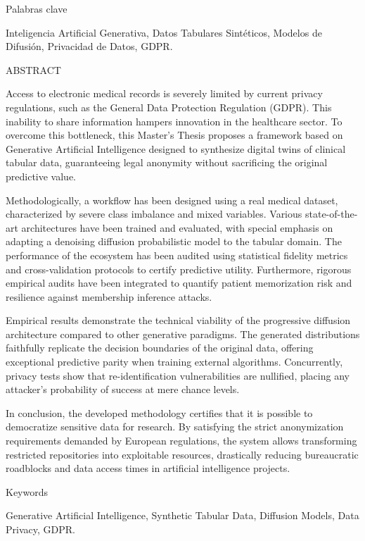 {\fontsize{13pt}{16pt}\selectfont\color{uaxblue} Palabras clave}\par

Inteligencia Artificial Generativa, Datos Tabulares Sintéticos, Modelos de Difusión, Privacidad de Datos, GDPR.

{\fontsize{16pt}{19pt}\selectfont\color{uaxblue} ABSTRACT}\par

Access to electronic medical records is severely limited by current privacy regulations, such as the General Data Protection Regulation (GDPR). This inability to share information hampers innovation in the healthcare sector. To overcome this bottleneck, this Master's Thesis proposes a framework based on Generative Artificial Intelligence designed to synthesize digital twins of clinical tabular data, guaranteeing legal anonymity without sacrificing the original predictive value.

Methodologically, a workflow has been designed using a real medical dataset, characterized by severe class imbalance and mixed variables. Various state-of-the-art architectures have been trained and evaluated, with special emphasis on adapting a denoising diffusion probabilistic model to the tabular domain. The performance of the ecosystem has been audited using statistical fidelity metrics and cross-validation protocols to certify predictive utility. Furthermore, rigorous empirical audits have been integrated to quantify patient memorization risk and resilience against membership inference attacks.

Empirical results demonstrate the technical viability of the progressive diffusion architecture compared to other generative paradigms. The generated distributions faithfully replicate the decision boundaries of the original data, offering exceptional predictive parity when training external algorithms. Concurrently, privacy tests show that re-identification vulnerabilities are nullified, placing any attacker's probability of success at mere chance levels.

In conclusion, the developed methodology certifies that it is possible to democratize sensitive data for research. By satisfying the strict anonymization requirements demanded by European regulations, the system allows transforming restricted repositories into exploitable resources, drastically reducing bureaucratic roadblocks and data access times in artificial intelligence projects.

{\fontsize{13pt}{16pt}\selectfont\color{uaxblue} Keywords}\par

Generative Artificial Intelligence, Synthetic Tabular Data, Diffusion Models, Data Privacy, GDPR.

\vspace{0.5cm}
